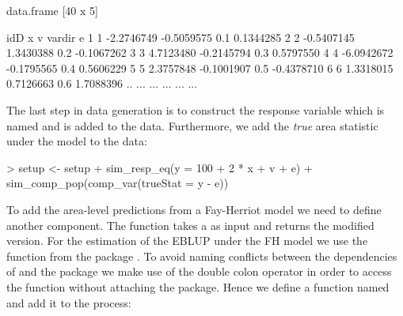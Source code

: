 \documentclass[article]{ajs}
\begin{document}
\begin{Schunk}
\begin{Soutput}
data.frame [40 x 5]

   idD          x          v vardir          e
1    1 -2.2746749 -0.5059575    0.1  0.1344285
2    2 -0.5407145  1.3430388    0.2 -0.1067262
3    3  4.7123480 -0.2145794    0.3  0.5797550
4    4 -6.0942672 -0.1795565    0.4  0.5606229
5    5  2.3757848 -0.1001907    0.5 -0.4378710
6    6  1.3318015  0.7126663    0.6  1.7088396
.. ...        ...        ...    ...        ...
\end{Soutput}
\end{Schunk}

The last step in data generation is to construct the response variable which is named  and is added to the data. Furthermore, we add the \textit{true} area statistic under the model to the data:

\begin{Schunk}
\begin{Sinput}
> setup <- setup %
+   sim_resp_eq(y = 100 + 2 * x + v + e) %
+   sim_comp_pop(comp_var(trueStat = y - e))
\end{Sinput}
\end{Schunk}

To add the area-level predictions from a Fay-Herriot model we need to define another component. The function takes a  as input and returns the modified version. For the estimation of the EBLUP under the FH model we use the function  from the package  \citep{molina13}. To avoid naming conflicts between the dependencies of  and the package  \citep{wickham14a} we make use of the double colon operator in order to access the function without attaching the package. Hence we define a function named  and add it to the process:
\end{document}
